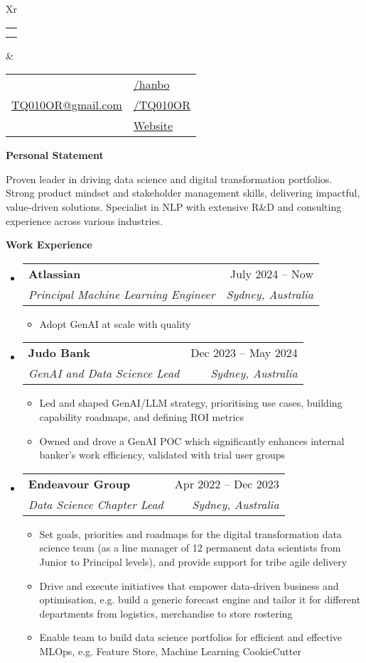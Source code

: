 \documentclass[letterpaper,12pt]{article}[leftmargin=*]
\makeatletter
\def \fullname {Bo HAN}
\def \subtitle {}
\def \linkedinicon {\faLinkedin}
\def \linkedinlink {https://linkedin.com/in/hanbo/}
\def \linkedintext {/hanbo}
\def \phoneicon {\faPhone}
\def \phonetext {+61-425-719-696}
\def \emailicon {\faEnvelope}
\def \emaillink {mailto:tq010or@gmail.com}
\def \emailtext {TQ010OR@gmail.com}
\def \githubicon {\faGithub}
\def \githublink {https://github.com/tq010or}
\def \githubtext {/TQ010OR}
\def \websiteicon {\faGlobe}
\def \websitelink {http://tq010or.github.io/}
\def \websitetext {Website}
\def \headertype {\doublecol} %
\def \entryspacing {-0pt}
\def \linkedin {\linkedinicon \hspace{3pt}\href{\linkedinlink}{\linkedintext}}
\def \phone {\phoneicon \hspace{3pt}{ \phonetext}}
\def \email {\emailicon \hspace{3pt}\href{\emaillink}{\emailtext}}
\def \github {\githubicon \hspace{3pt}\href{\githublink}{\githubtext}}
\def \website {\websiteicon \hspace{3pt}\href{\websitelink}{\websitetext}}
\renewcommand{\section}[2]{\vspace{5pt}
  \colorbox{secondary}{\color{white}\raggedbottom\normalsize\textbf{{#1}{\hspace{7pt}#2}}}
}
\newcommand{\resumeEntryStart}{\begin{itemize}[leftmargin=2.5mm]}
\newcommand{\resumeEntryEnd}{\end{itemize}\vspace{\entryspacing}}
\newcommand{\resumeItemListStart}{\begin{itemize}[leftmargin=4.5mm]}
\newcommand{\resumeItemListEnd}{\end{itemize}}
\newcommand{\resumeItem}[1]{
  \item\small{
    {#1 \vspace{-2pt}}
  }
}
\newcommand{\resumeText}[1]{
  \small{
    {#1 \vspace{-2pt}}
  }
}
\newcommand{\resumeEntryTSDL}[4]{
  \vspace{-1pt}\item[]
    \begin{tabularx}{0.97\textwidth}{X@{\hspace{60pt}}r}
      \textbf{\color{primary}#1} & {\firabook\color{accent}\small#2} \\
      \textit{\color{accent}\small#3} & \textit{\color{accent}\small#4} \\
    \end{tabularx}\vspace{-6pt}
}
\newcommand{\doublecol}[6]{
  \begin{tabularx}{\textwidth}{Xr}
    {
      \begin{tabular}[c]{l}
        \fontsize{35}{45}\selectfont{\color{primary}{{\textbf{\fullname}}}} \\
        {\textit{\subtitle}} %
      \end{tabular}
    } & {
      \begin{tabular}[c]{l@{\hspace{1.5em}}l}
        {\small#4} & {\small#1} \\
        {\small#5} & {\small#2} \\
        {\small#6} & {\small#3}
      \end{tabular}
    }
  \end{tabularx}
}
\newcommand{\singlecol}[6]{
  \begin{tabularx}{\textwidth}{Xr}
    {
      \begin{tabular}[b]{l}
        \fontsize{35}{45}\selectfont{\color{primary}{{\textbf{\fullname}}}} \\
        {\textit{\subtitle}} %
      \end{tabular}
    } & {
      \begin{tabular}[c]{l}
        {\small#1} \\
        {\small#2} \\
        {\small#3} \\
        {\small#4} \\
        {\small#5} \\
        {\small#6}
      \end{tabular}
    }
  \end{tabularx}
}
\makeatother
\begin{document}


\headertype{\linkedin}{\github}{\website}{\phone}{\email}{} %
\vspace{-8pt} %

\section{\faFlask}{Personal Statement}

    \resumeText{Proven leader in driving data science and digital transformation portfolios. Strong product mindset and stakeholder management skills, delivering impactful, value-driven solutions. Specialist in NLP with extensive R\&D and consulting experience across various industries. }

\section{\faPieChart}{Work Experience}
  \resumeEntryStart
    \resumeEntryTSDL
      {Atlassian}{July 2024 -- Now}
      {Principal Machine Learning Engineer}{Sydney, Australia}
    \resumeItemListStart
      \resumeItem {Adopt GenAI at scale with quality}
    \resumeItemListEnd
  \resumeEntryEnd

  \resumeEntryStart
    \resumeEntryTSDL
      {Judo Bank}{Dec 2023 -- May 2024}
      {GenAI and Data Science Lead}{Sydney, Australia}
    \resumeItemListStart
      \resumeItem {Led and shaped GenAI/LLM strategy, prioritising use cases, building capability roadmaps, and defining ROI metrics}
      \resumeItem {Owned and drove a GenAI POC which significantly enhances internal banker's work efficiency, validated with trial user groups}
    \resumeItemListEnd
  \resumeEntryEnd


  \resumeEntryStart
    \resumeEntryTSDL
      {Endeavour Group}{Apr 2022 -- Dec 2023}
      {Data Science Chapter Lead}{Sydney, Australia}
    \resumeItemListStart
      \resumeItem {Set goals, priorities and roadmaps for the digital transformation data science team (as a line manager of 12 permanent data scientists from Junior to Principal levels), and provide support for tribe agile delivery}
      \resumeItem {Drive and execute initiatives that empower data-driven business and optimisation, e.g. build a generic forecast engine and tailor it for different departments from logistics, merchandise to store rostering}
      \resumeItem {Enable team to build data science portfolios for efficient and effective MLOps, e.g. Feature Store, Machine Learning CookieCutter}
    \resumeItemListEnd
  \resumeEntryEnd
\end{document}
